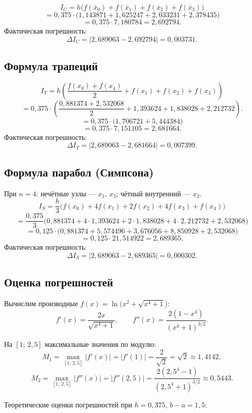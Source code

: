 \documentclass[a4paper, final]{article}
\begin{document}
\[
I_C = h\bigl(f(\bar x_0)+f(\bar x_1)+f(\bar x_2)+f(\bar x_3)\bigr)\]
    \[= 0{,}375\cdot\bigl(1{,}143871+1{,}625247+2{,}033231+2{,}378435\bigr)\]
    \[= 0{,}375\cdot 7{,}180784 = 2{,}692794.
\]
Фактическая погрешность:
\[
\Delta I_C = |2{,}689063 - 2{,}692794| = 0{,}003731.
\]

\subsection{Формула трапеций}

\[
I_T = h\!\left(\frac{f(x_0)+f(x_4)}{2}+f(x_1)+f(x_2)+f(x_3)\right)\]
    \[= 0{,}375\cdot\!\left(\frac{0{,}881374+2{,}532068}{2}+1{,}393624+1{,}838028+2{,}212732\right).
\]
\[
= 0{,}375\cdot\bigl(1{,}706721 + 5{,}444384\bigr)\]
\[= 0{,}375\cdot 7{,}151105 = 2{,}681664.
\]
Фактическая погрешность:
\[
\Delta I_T = |2{,}689063 - 2{,}681664| = 0{,}007399.
\]

\subsection{Формула парабол (Симпсона)}

При $n=4$: нечётные узлы --- $x_1$, $x_3$; чётный внутренний --- $x_2$.
\[
I_S = \frac{h}{3}\bigl(f(x_0)+4f(x_1)+2f(x_2)+4f(x_3)+f(x_4)\bigr)
\]
\[
= \frac{0{,}375}{3}\bigl(0{,}881374+4\cdot1{,}393624+2\cdot1{,}838028+4\cdot2{,}212732+2{,}532068\bigr)
\]
\[
= 0{,}125\cdot\bigl(0{,}881374+5{,}574496+3{,}676056+8{,}850928+2{,}532068\bigr)\]
\[= 0{,}125\cdot 21{,}514922 = 2{,}689365.
\]
Фактическая погрешность:
\[
\Delta I_S = |2{,}689063 - 2{,}689365| = 0{,}000302.
\]

\subsection{Оценка погрешностей}

Вычислим производные $f(x) = \ln\!\bigl(x^2+\sqrt{x^4+1}\bigr)$:
\[
f'(x) = \frac{2x}{\sqrt{x^4+1}}, \qquad
f''(x) = \frac{2(1-x^4)}{(x^4+1)^{3/2}}.
\]

На $[1;\,2{,}5]$ максимальные значения по модулю:
\[
M_1 = \max_{[1;\,2{,}5]}|f'(x)| = |f'(1)| = \frac{2}{\sqrt{2}} = \sqrt{2} \approx 1{,}4142,
\]
\[
M_2 = \max_{[1;\,2{,}5]}|f''(x)| = |f''(2{,}5)| = \frac{2(2{,}5^4-1)}{(2{,}5^4+1)^{3/2}}
    \approx 0{,}5443.
\]

Теоретические оценки погрешностей при $h = 0{,}375$, $b - a = 1{,}5$:
\end{document}
